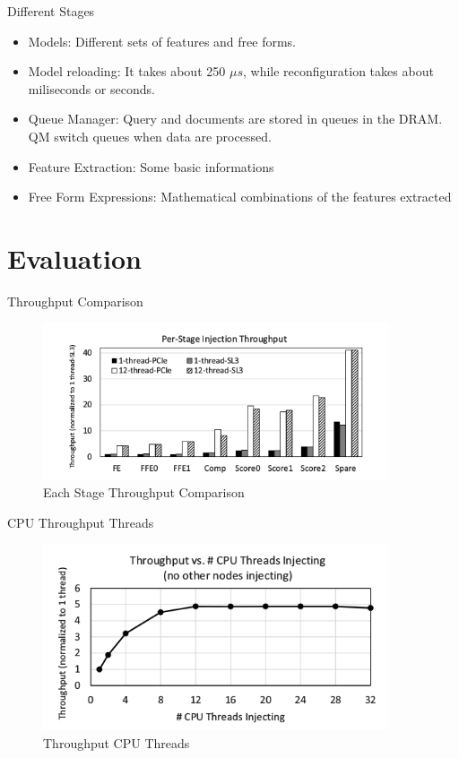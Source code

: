 \documentclass[t]{beamer}
\begin{document}
\begin{frame}{Different Stages}
    \begin{itemize}
        \item Models: Different sets of features and free forms. 
        \item Model reloading: It takes about 250 $\mu s$, while reconfiguration takes about miliseconds
        or seconds.
        \item Queue Manager: Query and documents are stored in queues in the DRAM. QM switch queues when
        data are processed.
        \item Feature Extraction: Some basic informations
        \item Free Form Expressions: Mathematical combinations of the features extracted
    \end{itemize}
\end{frame}

\section{Evaluation}

\begin{frame}{Throughput Comparison}
    \begin{figure}
        \includegraphics[width=4in]{img/throughput-comparison.png}
        \caption{Each Stage Throughput Comparison}
    \end{figure}
\end{frame}

\begin{frame}{CPU Throughput Threads}
    \begin{figure}
        \includegraphics[width=4in]{img/throughput-cpu-thread.png}
        \caption{Throughput CPU Threads}
    \end{figure}
\end{frame}
\end{document}
